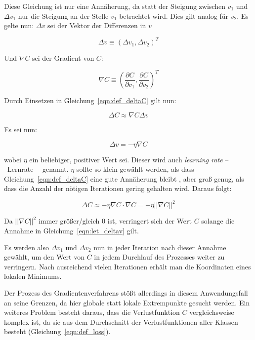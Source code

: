 Diese Gleichung ist nur eine Annäherung, da statt der Steigung zwischen $v_1$ und $\Delta v_1$ nur die Steigung an der Stelle $v_1$ betrachtet wird. Dies gilt analog für $v_2$.
Es gelte nun: $\Delta v$ sei der Vektor der Differenzen in $v$

\begin{equation}
\Delta v\equiv (\Delta v_1, \Delta v_2)^T
\end{equation}

Und $\nabla C$ sei der Gradient von $C$:

\begin{equation}
\nabla C\equiv \left(\frac{\partial C}{\partial v_1}, \frac{\partial C}{\partial v_2}\right)^T
\end{equation}

Durch Einsetzen in Gleichung~\ref{eqn:def_deltaC} gilt nun:

\begin{equation}
\Delta C \approx \nabla C\Delta v
\end{equation}

Es sei nun:

\begin{equation}
\label{eqn:let_deltav}
\Delta v = -\eta\nabla C
\end{equation}

wobei $\eta$ ein beliebiger, positiver Wert sei. Dieser wird auch \textit{learning rate} --~Lernrate~-- genannt. $\eta$ sollte so klein gewählt werden, als dass Gleichung~\ref{eqn:def_deltaC} eine gute Annäherung bleibt \cite[Kap.~1]{nielsen_15}, aber groß genug, als dass die Anzahl der nötigen Iterationen gering gehalten wird. Daraus folgt:

\begin{equation}
\Delta C\approx -\eta\nabla C\cdot\nabla C= -\eta\left|\left|\nabla C\right| \right|^2
\end{equation}

Da $\left|\left|\nabla C\right| \right|^2$ immer größer/gleich 0 ist, verringert sich der Wert $C$ solange die Annahme in Gleichung~\ref{eqn:let_deltav} gilt. 

Es werden also $\Delta v_1$ und $\Delta v_2$ nun in jeder Iteration nach dieser Annahme gewählt, um den Wert von $C$ in jedem Durchlauf des Prozesses weiter zu verringern. Nach ausreichend vielen Iterationen erhält man die Koordinaten eines lokalen Minimums.

Der Prozess des Gradientenverfahrens stößt allerdings in diesem Anwendungsfall an seine Grenzen, da hier globale statt lokale Extrempunkte gesucht werden. Ein weiteres Problem besteht daraus, dass die Verlustfunktion $C$ vergleichsweise komplex ist, da sie aus dem Durchschnitt der Verlustfunktionen aller Klassen besteht (\vgl Gleichung~\ref{eqn:def_loss}).

